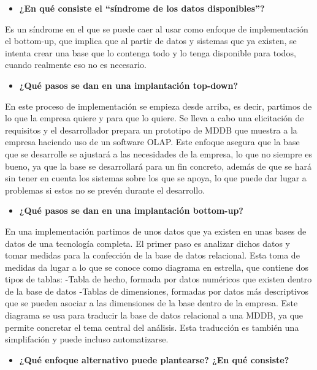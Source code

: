 \documentclass[paper=a4, fontsize=11pt]{scrartcl} %
\begin{document}
\begin{itemize}
\item \textbf{ ¿En qué consiste el ``síndrome de los datos disponibles''?}
\end{itemize}
Es un síndrome en el que se puede caer al usar como enfoque de implementación el bottom-up, que implica que al partir de datos y sistemas que ya existen, se intenta crear una base que lo contenga todo y lo tenga disponible para todos, cuando realmente eso no es necesario.

\begin{itemize}
\item \textbf{ ¿Qué pasos se dan en una implantación top-down?}
\end{itemize}
En este proceso de implementación se empieza desde arriba, es decir, partimos de lo que la empresa quiere y para que lo quiere. Se lleva a cabo una elicitación de requisitos y el desarrollador prepara un prototipo de MDDB que muestra a la empresa haciendo uso de un software OLAP. Este enfoque asegura que la base que se desarrolle se ajustará a las necesidades de la empresa, lo que no siempre es bueno, ya que la base se desarrollará para un fin concreto, además de que se hará sin tener en cuenta los sistemas sobre los que se apoya, lo que puede dar lugar a problemas si estos no se prevén durante el desarrollo. 

\begin{itemize}
\item \textbf{¿Qué pasos se dan en una implantación bottom-up?}
\end{itemize}
	En una implementación partimos de unos datos que ya existen en unas bases de datos de una tecnología completa. El primer paso es analizar dichos datos y tomar medidas para la confección de la base de datos relacional. Esta toma de medidas da lugar a lo que se conoce como diagrama en estrella, que contiene dos tipos de tablas:
	-Tabla de hecho, formada por datos numéricos que existen dentro de la base de datos
	-Tablas de dimensiones, formadas por datos más descriptivos que se pueden asociar a las dimensiones de la base dentro de la empresa.
Este diagrama se usa para traducir la base de datos relacional a una MDDB, ya que permite concretar el tema central del análisis. Esta traducción es también una simplifación y puede incluso automatizarse. 

\begin{itemize}
\item \textbf{¿Qué enfoque alternativo puede plantearse? ¿En qué consiste?}
\end{itemize}
\end{document}
